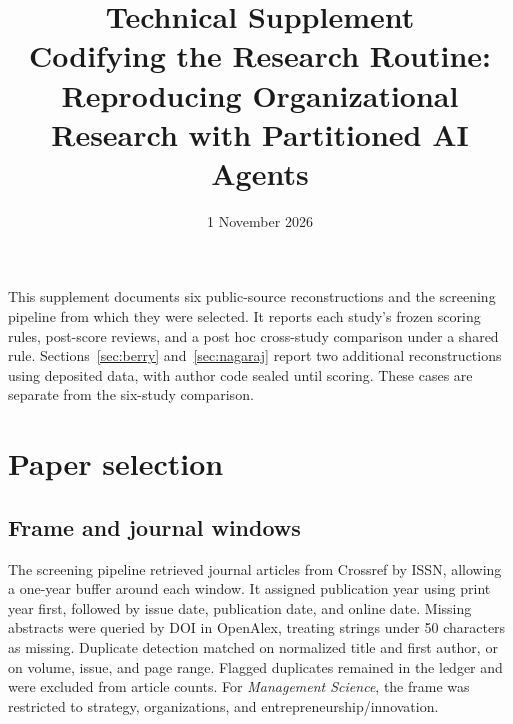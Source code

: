 \documentclass[11pt]{article}
\title{Technical Supplement\\\large Codifying the Research Routine: Reproducing Organizational Research with Partitioned AI Agents}
\author{}
\date{1 November 2026}
\begin{document}
\maketitle
\vspace{-1em}
This supplement documents six public-source reconstructions and the screening pipeline from which they were selected. It reports each study's frozen scoring rules, post-score reviews, and a post hoc cross-study comparison under a shared rule. Sections~\ref{sec:berry} and~\ref{sec:nagaraj} report two additional reconstructions using deposited data, with author code sealed until scoring. These cases are separate from the six-study comparison.

\tableofcontents
\clearpage
\section{Paper selection}\label{sec:selection}
\subsection{Frame and journal windows}
The screening pipeline retrieved journal articles from Crossref by ISSN, allowing a one-year buffer around each window. It assigned publication year using print year first, followed by issue date, publication date, and online date. Missing abstracts were queried by DOI in OpenAlex, treating strings under 50 characters as missing. Duplicate detection matched on normalized title and first author, or on volume, issue, and page range. Flagged duplicates remained in the ledger and were excluded from article counts. For \textit{Management Science}, the frame was restricted to strategy, organizations, and entrepreneurship/innovation.
\end{document}
